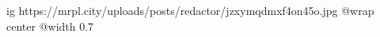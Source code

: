 
 
 
 
 

\ifcmt
  ig https://mrpl.city/uploads/posts/redactor/jzxymqdmxf4on45o.jpg
  @wrap center
  @width 0.7
\fi
